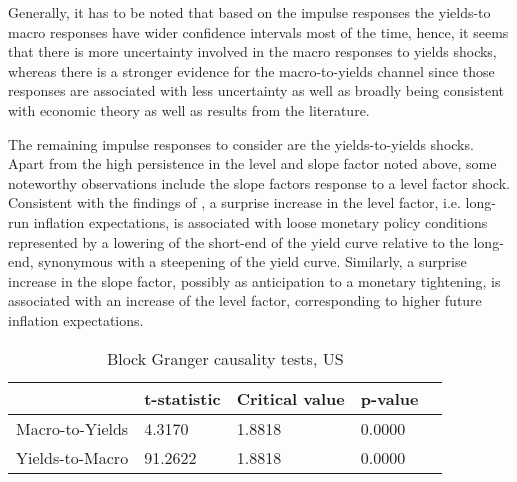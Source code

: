 
Generally, it has to be noted that based on the impulse responses the yields-to macro responses have wider confidence intervals most of the time, hence, it seems that there is more uncertainty involved in the macro responses to yields shocks, whereas there is a stronger evidence for the macro-to-yields channel since those responses are associated with less uncertainty as well as broadly being consistent with economic theory as well as results from the literature. 

The remaining impulse responses to consider are the yields-to-yields shocks. 
Apart from the high persistence in the level and slope factor noted above, some noteworthy observations include the slope factors response to a level factor shock.
Consistent with the findings of \citet{diebold2006macroeconomy}, a surprise increase in the level factor, i.e. long-run inflation expectations, is associated with loose monetary policy conditions represented by a lowering of the short-end of the yield curve relative to the long-end, synonymous with a steepening of the yield curve.
Similarly, a surprise increase in the slope factor, possibly as anticipation to a monetary tightening, is associated with an increase of the level factor, corresponding to higher future inflation expectations. 




\begin{table}[!t]
    \centering
    \begin{tabular}{lllll}
    \toprule
    {} &     t-statistic &      Critical value &                 p-value 
    \\
    \midrule
    Macro-to-Yields &  4.3170 &  1.8818 &  0.0000 &  \\
    Yields-to-Macro &  91.2622 &  1.8818 &  0.0000  \\
\bottomrule
    \end{tabular}
    \caption{Block Granger causality tests, US}
    \label{tab:granger_us}
\end{table}

